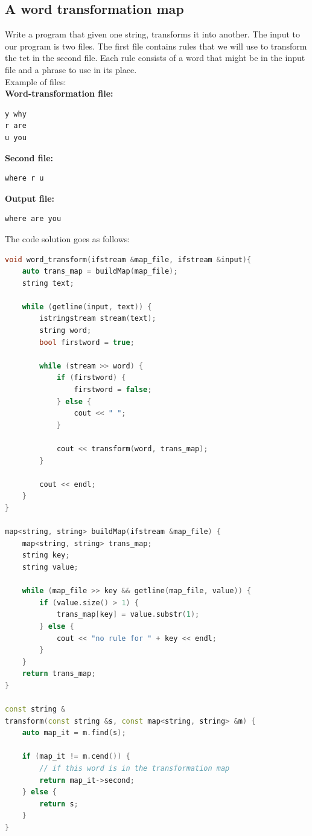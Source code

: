 \subsection{A word transformation map}

Write a program that given one string, transforms it into another. The input to our program
is two files. The first file contains rules that we will use to transform the tet in the second
file. Each rule consists of a word that might be in the input file and a phrase to use in its 
place.\\

Example of files:\\

\noindent \textbf{Word-transformation file:}
\begin{verbatim}
y why
r are
u you
\end{verbatim}

\noindent \textbf{Second file:}
\begin{verbatim}
where r u
\end{verbatim}

\noindent \textbf{Output file:}
\begin{verbatim}
where are you
\end{verbatim}

The code solution goes as follows: \\

\begin{lstlisting}[language=C++]
void word_transform(ifstream &map_file, ifstream &input){
    auto trans_map = buildMap(map_file);
    string text;

    while (getline(input, text)) {
        istringstream stream(text);
        string word;
        bool firstword = true;

        while (stream >> word) {
            if (firstword) {
                firstword = false;
            } else {
                cout << " ";
            }
            
            cout << transform(word, trans_map);
        }

        cout << endl;
    }
}

map<string, string> buildMap(ifstream &map_file) {
    map<string, string> trans_map;
    string key;
    string value;

    while (map_file >> key && getline(map_file, value)) {
        if (value.size() > 1) {
            trans_map[key] = value.substr(1);
        } else {
            cout << "no rule for " + key << endl;
        }
    }
    return trans_map;
}

const string &
transform(const string &s, const map<string, string> &m) {
    auto map_it = m.find(s);

    if (map_it != m.cend()) {
        // if this word is in the transformation map
        return map_it->second;
    } else {
        return s;
    }
}
\end{lstlisting}

